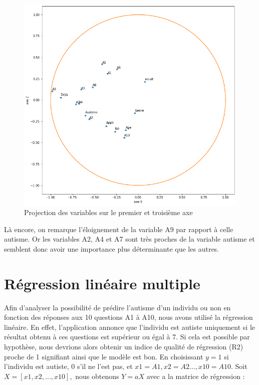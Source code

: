 \documentclass[12,french]{report}
\begin{document}
\begin{figure}[H]
\begin{minipage}[c]{.46\linewidth}
        \includegraphics[width=1\textwidth]{./Images/20}
        \caption{Projection des variables sur le premier et troisième axe}
    \end{minipage}
\end{figure}\vspace{0.1cm}

Là encore, on remarque l’éloignement de la variable A9 par rapport à celle autisme. Or les variables A2, A4 et A7 sont très proches de la variable autisme et semblent donc avoir une importance plus déterminante que les autres.

\chapter{Régression linéaire multiple}

Afin d’analyser la possibilité de prédire l’autisme d’un individu ou non en fonction des réponses aux 10 questions A1 à A10, nous avons utilisé la régression linéaire. En effet, l’application annonce que l’individu est autiste uniquement si le résultat obtenu à ces questions est supérieur ou égal à 7. Si cela est possible par hypothèse, nous devrions alors obtenir un indice de qualité de régression (R2) proche de 1 signifiant ainsi que le modèle est bon.
    En choisissant $y = 1$ si l’individu est autiste, 0 s’il ne l’est pas, et $x1=A1, x2=A2…,x10=A10$. Soit $X=[x1,x2,...,x10],$  nous obtenons $Y=aX$ avec a la matrice de régression :
\end{document}
